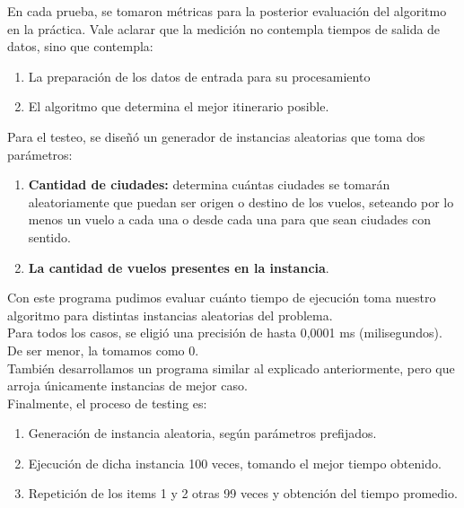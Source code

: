 \documentclass[10pt,a4paper]{article}
\begin{document}
\noindent En cada prueba, se tomaron métricas para la posterior evaluación del algoritmo en la práctica. Vale aclarar que la medición no contempla tiempos de salida de datos, sino que contempla:\\

\noindent \begin{enumerate}
\item La preparación de los datos de entrada para su procesamiento
\item El algoritmo que determina el mejor itinerario posible.\\
\end{enumerate}

\noindent Para el testeo, se diseñó un generador de instancias aleatorias que toma dos parámetros:\\


\noindent \begin{enumerate}
\item \textbf{Cantidad de ciudades:} determina cuántas ciudades se tomarán aleatoriamente que puedan ser origen o destino de los vuelos, seteando por lo menos un vuelo a cada una o desde cada una para que sean ciudades con sentido.

\item \textbf{La cantidad de vuelos presentes en la instancia}.\\
\end{enumerate}

\noindent Con este programa pudimos evaluar cuánto tiempo de ejecución toma nuestro algoritmo para distintas instancias aleatorias del problema.\\

\noindent Para todos los casos, se eligió una precisión de hasta 0,0001 ms (milisegundos). De ser menor, la tomamos como 0.\\

\noindent También desarrollamos un programa similar al explicado anteriormente, pero que arroja únicamente instancias de mejor caso.\\

\noindent Finalmente, el proceso de testing es:\\


\noindent \begin{enumerate}
\item Generación de instancia aleatoria, según parámetros prefijados.
\item Ejecución de dicha instancia 100 veces, tomando el mejor tiempo obtenido.
\item Repetición de los items 1 y 2 otras 99 veces y obtención del tiempo promedio.
\end{enumerate}
\end{document}
